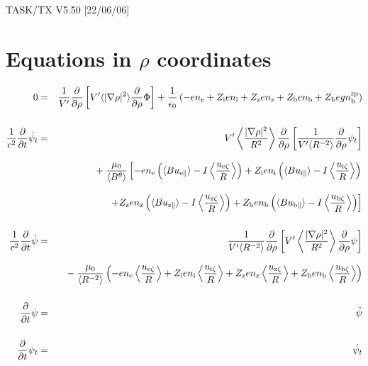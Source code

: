 \documentclass[11pt]{article}
\def\r#1{{\rm#1}}
\def\ave#1{\left\langle#1\right\rangle}
\def\aves#1{\langle#1\rangle}
\def\para{\parallel}
\def\ddrho{\frac{\partial}{\partial\rho}}
\def\ddt{\frac{\partial}{\partial t}}
\def\gradrho2{\aves{|\nabla\rho|^2}}
\def\psid{\dot{\psi}}
\def\psit{\psi_t}
\def\psitd{\dot{\psit}}
\def\nee{n_\r{e}}
\def\ni{n_\r{i}}
\def\nz{n_\r{z}}
\def\nb{n_\r{b}}
\def\Zi{Z_\r{i}}
\def\Zz{Z_\r{z}}
\def\Zb{Z_\r{b}}
\def\uzt#1{u_{\r{#1}\zeta}}
\def\upara#1{u_{\r{#1}\para}}
\def\nbrp{n_\r{b}^\r{rp}}
\begin{document}
\begin{center}
TASK/TX V5.50 [22/06/06]
\end{center}

\section{Equations in $\rho$ coordinates}
\vspace{-5mm}

%
\begin{eqnarray}
  0 &=&
%
    \frac{1}{V'} \ddrho \left[ V' \gradrho2 \ddrho{\Phi} \right]
%
  + \frac{1}{\epsilon_0}
%
    \left(-e \nee + \Zi e \ni + \Zz e \nz + \Zb e \nb + \Zb e g \nbrp \right)
\\[5mm]
  \frac{1}{c^2} \ddt \psitd &=&
%
    V' \ave{\frac{|\nabla\rho|^2}{R^2}} \ddrho \left[ \frac{1}{V'\aves{R^{-2}}}
				         \ddrho \psit \right] \nonumber\\[3mm]&&{}
%
  + \frac{\mu_0}{\aves{B^\theta}}
%
    \left[-     e \nee \left( \aves{B\upara{e}} - I\ave{\frac{\uzt{e}}{R}} \right)
          + \Zi e \ni  \left( \aves{B\upara{i}} - I\ave{\frac{\uzt{i}}{R}} \right)
    \right.\nonumber\\[3mm]&&{}
    \left.+ \Zz e \nz  \left( \aves{B\upara{z}} - I\ave{\frac{\uzt{z}}{R}} \right)
          + \Zb e \nb  \left( \aves{B\upara{b}} - I\ave{\frac{\uzt{b}}{R}} \right) \right]
\\[5mm]
  \frac{1}{c^2} \ddt \psid &=&
%
  \frac{1}{V'\aves{R^{-2}}} \ddrho \left[ V'
				    \ave{\frac{|\nabla\rho|^2}{R^2}}
				    \ddrho \psi \right] \nonumber\\[3mm]&&{}
%
  - \frac{\mu_0}{\aves{R^{-2}}} \left(-e \nee \ave{\frac{\uzt{e}}{R}}
			         + \Zi e \ni  \ave{\frac{\uzt{i}}{R}}
			         + \Zz e \nz  \ave{\frac{\uzt{z}}{R}}
			         + \Zb e \nb  \ave{\frac{\uzt{b}}{R}} \right)
%
\\[5mm]
  \ddt \psi &=&
%
  \psid
\\[5mm]
  \ddt \psit &=&
%
  \psitd
\end{eqnarray}
%

\end{document}
